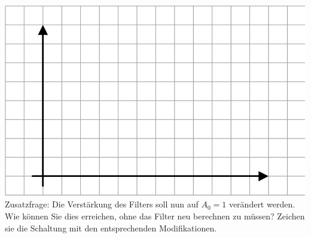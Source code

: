 \documentclass[A4]{scrartcl}
\begin{document}
  \includegraphics{normpaper.png}\\
  Zusatzfrage: Die Verstärkung des Filters soll nun auf $A_0 = 1$ verändert werden. Wie können Sie dies erreichen, ohne das Filter neu berechnen zu müssen? Zeichen sie die Schaltung mit den entsprechenden Modifikationen.
\end{document}
